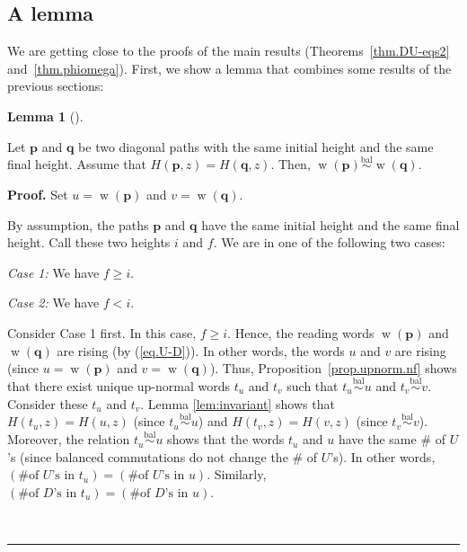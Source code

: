 \documentclass[numbers=enddot,12pt,final,onecolumn,notitlepage]{scrartcl}%
\theoremstyle{definition}
\newtheorem{lem}[theo]{Lemma}
\newenvironment{lemma}[1][]
{\begin{lem}[#1]\begin{leftbar}}
{\end{leftbar}\end{lem}}
\newenvironment{proof}[1][Proof]{\noindent\textbf{#1.} }{\ \rule{0.5em}{0.5em}}
\newcommand{\pp}{\mathbf{p}}
\newcommand{\qq}{\mathbf{q}}
\newcommand{\w}{\operatorname{w}}
\newcommand{\balsim}{\overset{\operatorname*{bal}}{\sim}}
\newcommand{\tup}[1]{\left( #1 \right)}
\newenvironment{verlong}{}{}
\begin{document}
\begin{verlong}
\subsection{A lemma}

We are getting close to the proofs of the main results (Theorems~\ref{thm.DU-eqs2} and~\ref{thm.phiomega}).
First, we show a lemma that combines some results of the previous sections:

\begin{lemma}
\label{lem.4to5}
Let $\pp$ and $\qq$ be two diagonal paths with
the same initial height and the same final height. Assume that $H\left(
\pp,z\right)  =H\left(  \qq,z\right)  $. Then,
$\w\tup{\pp} \balsim \w\tup{\qq}$.
\end{lemma}

\begin{proof}
Set $u=\w\left(  \pp\right)  $ and $v=\w\left(  \qq\right)  $.

By assumption, the paths $\pp$ and $\qq$ have the same initial
height and the same final height. Call these two heights $i$ and $f$. We are
in one of the following two cases:

\textit{Case 1:} We have $f\geq i$.

\textit{Case 2:} We have $f<i$.

Consider Case 1 first. In this case, $f\geq i$. Hence, the reading words
$\w\left(  \pp\right)  $ and $\w\left(
\qq\right)  $ are rising (by (\ref{eq.U-D})). In other words, the words
$u$ and $v$ are rising (since $u=\w\left(  \pp\right)  $
and $v=\w\left(  \qq\right)  $). Thus,
Proposition~\ref{prop.upnorm.nf} shows that there exist unique up-normal words
$t_{u}$ and $t_{v}$ such that $t_{u} \balsim u$ and
$t_{v} \balsim v$. Consider these $t_{u}$ and
$t_{v}$. Lemma \ref{lem:invariant} shows that $H\left(  t_{u},z\right)
=H\left(  u,z\right)  $ (since $t_{u} \balsim u$)
and $H\left(  t_{v},z\right)  =H\left(  v,z\right)  $ (since $t_{v} \balsim v$).
Moreover, the relation $t_{u} \balsim u$ shows that the words $t_{u}$ and $u$
have the same \# of $U$'s (since balanced commutations do not change the \# of
$U$'s). In other words, $\left(  \text{\# of }U\text{'s in }t_{u}\right)
=\left(  \text{\# of }U\text{'s in }u\right)  $. Similarly, $\left(  \text{\#
of }D\text{'s in }t_{u}\right)  =\left(  \text{\# of }D\text{'s in }u\right)
$.


\end{proof}
\end{verlong}
\end{document}
